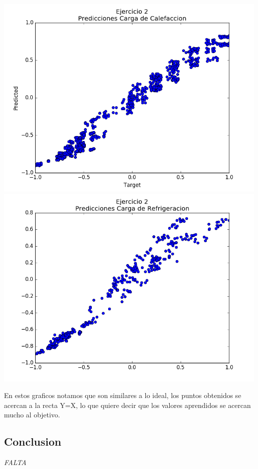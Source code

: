 \includegraphics[scale=0.4]{img/ej2-calef}
\includegraphics[scale=0.4]{img/ej2-refrig}


En estos graficos notamos que son similares a lo ideal, los puntos obtenidos se acercan a la recta Y=X, lo que quiere decir que los valores aprendidos se acercan mucho al objetivo.
\subsection{Conclusion}

\emph{\color{red} FALTA }
